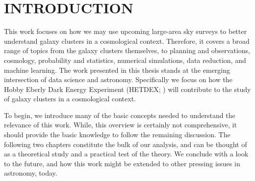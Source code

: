 %
%
%



\pagestyle{plain} %
\setcounter{page}{1}


\chapter[\uppercase{Introduction}]{\uppercase{Introduction}}

This work focuses on how we may use upcoming large-area sky surveys to better understand galaxy clusters in a cosmological context. Therefore, it covers a broad range of topics from the galaxy clusters themselves, to planning and observations, cosmology, probability and statistics, numerical simulations, data reduction, and machine learning. The work presented in this thesis stands at the emerging intersection of data science and astronomy. Specifically we focus on how the Hobby Eberly Dark Energy Experiment (HETDEX; \citealt{Hill2008}) will contribute to the study of galaxy clusters in a cosmological context.

To begin, we introduce many of the basic concepts needed to understand the relevance of this work. While, this overview is certainly not comprehensive, it should provide the basic knowledge to follow the remaining discussion. The following two chapters constitute the bulk of our analysis, and can be thought of as a theoretical study and a practical test of the theory. We conclude with a look to the future, and how this work might be extended to other pressing issues in astronomy, today.

